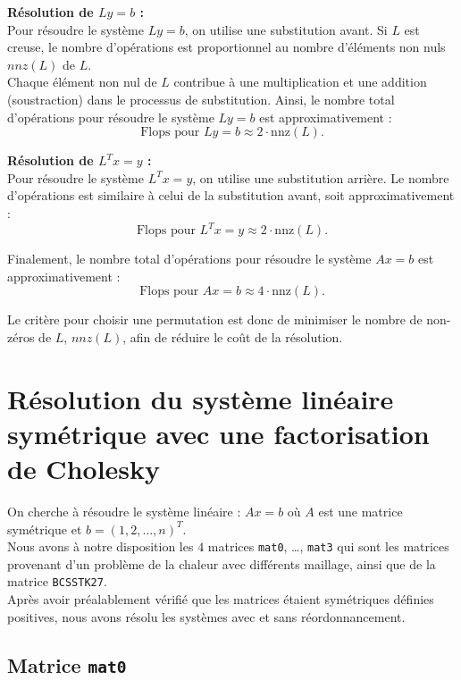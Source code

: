 \documentclass[12pt,a4paper]{article}
\begin{document}
\noindent\textbf{Résolution de $Ly = b$ :} \\
Pour résoudre le système $Ly = b$, on utilise une substitution avant.
Si $L$ est creuse, le nombre d'opérations est proportionnel au nombre d'éléments non nuls $nnz(L)$ de $L$. \\
Chaque élément non nul de $L$ contribue à une multiplication et une addition (soustraction) dans le processus de substitution.
Ainsi, le nombre total d'opérations pour résoudre le système $Ly = b$ est approximativement : 
$$
\text{Flops pour } L y = b \approx 2 \cdot \text{nnz}(L).
$$

\noindent\textbf{Résolution de $L^Tx = y$ :} \\
Pour résoudre le système $L^Tx = y$, on utilise une substitution arrière.
Le nombre d'opérations est similaire à celui de la substitution avant, soit approximativement :
$$
\text{Flops pour } L^T x = y \approx 2 \cdot \text{nnz}(L).
$$

Finalement, le nombre total d'opérations pour résoudre le système $Ax = b$ est approximativement :
$$
\text{Flops pour } Ax = b \approx 4 \cdot \text{nnz}(L).
$$

\noindent Le critère pour choisir une permutation est donc de minimiser le nombre de non-zéros de $L$, $nnz(L)$, afin de réduire le coût de la résolution.


\section{Résolution du système linéaire symétrique avec une factorisation
de Cholesky}

On cherche à résoudre le système linéaire : $Ax = b$ où $A$ est une matrice symétrique et $b = (1, 2, \ldots, n)^T$. \\
Nous avons à notre disposition les $4$ matrices \texttt{mat0}, \ldots, \texttt{mat3} qui sont les matrices provenant d’un problème de la chaleur avec différents maillage, ainsi que de la matrice \texttt{BCSSTK27}. \\

Après avoir préalablement vérifié que les matrices étaient symétriques définies positives, nous avons résolu les systèmes avec et sans réordonnancement.

\subsection{Matrice \texttt{mat0}}
\end{document}
